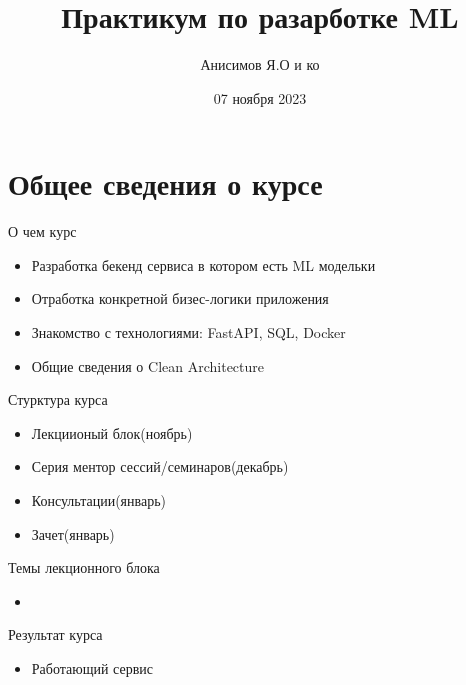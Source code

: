 \documentclass[
  ignorenonframetext,
  aspectratio=169,
  aspectratio=169]{beamer}
\title{Практикум по разарботке ML}
\author{Анисимов Я.О и ко}
\date{07 ноября 2023}
\institute{ИТМО}
\providecommand{\tightlist}{%
  \setlength{\itemsep}{0pt}\setlength{\parskip}{0pt}}
\begin{document}
\frame{\titlepage}

\begin{frame}[allowframebreaks]
  \tableofcontents[hideallsubsections]
\end{frame}
\hypertarget{ux43eux431ux449ux435ux435-ux441ux432ux435ux434ux435ux43dux438ux44f-ux43e-ux43aux443ux440ux441ux435}{%
\section{Общее сведения о
курсе}\label{ux43eux431ux449ux435ux435-ux441ux432ux435ux434ux435ux43dux438ux44f-ux43e-ux43aux443ux440ux441ux435}}

\begin{frame}{О чем курс}
\protect\hypertarget{ux43e-ux447ux435ux43c-ux43aux443ux440ux441}{}
\begin{itemize}
\tightlist
\item
  Разработка бекенд сервиса в котором есть ML модельки
\item
  Отработка конкретной бизес-логики приложения
\item
  Знакомство с технологиями: FastAPI, SQL, Docker
\item
  Общие сведения о Clean Architecture
\end{itemize}
\end{frame}

\begin{frame}{Стурктура курса}
\protect\hypertarget{ux441ux442ux443ux440ux43aux442ux443ux440ux430-ux43aux443ux440ux441ux430}{}
\begin{itemize}
\tightlist
\item
  Лекциионый блок(ноябрь)
\item
  Серия ментор сессий/семинаров(декабрь)
\item
  Консультации(январь)
\item
  Зачет(январь)
\end{itemize}
\end{frame}

\begin{frame}{Темы лекционного блока}
\protect\hypertarget{ux442ux435ux43cux44b-ux43bux435ux43aux446ux438ux43eux43dux43dux43eux433ux43e-ux431ux43bux43eux43aux430}{}
\begin{itemize}
\tightlist
\item
\end{itemize}
\end{frame}

\begin{frame}{Результат курса}
\protect\hypertarget{ux440ux435ux437ux443ux43bux44cux442ux430ux442-ux43aux443ux440ux441ux430}{}
\begin{itemize}
\tightlist
\item
  Работающий сервис
\end{itemize}
\end{frame}
\end{document}
